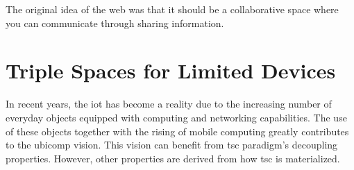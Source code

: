 
\begin{savequote}[50mm]
The original idea of the web was that it should be a collaborative space where you can communicate through sharing information.
\end{savequote}


\newcommand{\codigo}[1]{``\texttt{#1}''}
\newcommand{\primquery}{\emph{query}}
\newcommand{\primread}{\emph{read}}
\newcommand{\primtake}{\emph{take}}
\newcommand{\primwrite}{\emph{write}}

\newcommand{\coordspace}{\emph{coordination space}}
\newcommand{\outerspace}{\emph{outer space}}
\newcommand{\coordinators}{\emph{coordinators}}
\newcommand{\asteroids}{\emph{asteroids}}
\newcommand{\asteroid}{\emph{asteroid}}
\newcommand{\selfgraphs}{\emph{self-managed graphs}}
\newcommand{\osapi}{\emph{OSAPI}}


\chapter{Triple Spaces for Limited Devices}
\label{cha:tsc}
\newcommand{\pathchapthree}{3_tsc}

\ifpdf
    \graphicspath{{\pathchapthree/figures/PNG/}{\pathchapthree/figures/PDF/}{\pathchapthree/figures/}}
\else
    \graphicspath{{\pathchapthree/figures/EPS/}{\pathchapthree/figures/}}
\fi









In recent years, the \acf{iot} has become a reality due to the increasing number of everyday objects equipped with computing and networking capabilities.
The use of these objects together with the rising of mobile computing greatly contributes to the \ac{ubicomp} vision.
This vision can benefit from \acf{tsc} paradigm's decoupling properties. %
However, other properties are derived from how \ac{tsc} is materialized. %


